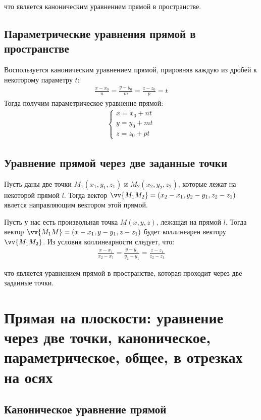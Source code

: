 \documentclass[a4paper,12pt,oneside]{extbook}
\theoremstyle{numbered}
\theoremstyle{unnumbered}
\theoremstyle{named}
\theoremstyle{unnumbered}
\theoremstyle{named}
\theoremstyle{named}
\theoremstyle{named}
\begin{document}
что является каноническим уравнением прямой в пространстве.

\subsection{Параметрические уравнения прямой в пространстве}
Воспользуется каноническим уравнением прямой, прировняв каждую из дробей к некоторому параметру \(t\):
\begin{gather*}
    \frac{x - x_0}{n} = \frac{y - y_0}{m} = \frac{z - z_0}{p} = t
\end{gather*}
Тогда получим параметрическое уравнение прямой:
\begin{gather*}
    \begin{cases}
        x = x_0 + nt \\
        y = y_0 + mt \\
        z = z_0 + pt
    \end{cases}
\end{gather*}

\subsection{Уравнение прямой через две заданные точки}
Пусть даны две точки \(M_1(x_1, y_1, z_1)\) и \(M_2(x_2, y_2, z_2)\), которые лежат на некоторой прямой \(l\). Тогда вектор  \(\vv{M_1M_2} = (x_2 - x_1, y_2 - y_1, z_2 - z_1)\) явлется направляющим вектором этой прямой.

Пусть у нас есть произвольная точка \(M(x, y, z)\), лежащая на прямой \(l\). Тогда вектор \(\vv{M_1M} = (x - x_1, y - y_1, z - z_1)\) будет коллинеарен вектору \(\vv{M_1M_2}\). Из условия коллинеарности следует, что:
\begin{gather*}
    \frac{x - x_1}{x_2 - x_1} = \frac{y - y_1}{y_2 - y_1} = \frac{z - z_1}{z_2 - z_1}
\end{gather*}

что является уравнением прямой в пространстве, которая проходит через две заданные точки.

\section{Прямая на плоскости: уравнение через две точки, каноническое, параметрическое, общее, в отрезках на осях}\label{sec:line_on_plane}

\subsection{Каноническое уравнение прямой}
\end{document}
